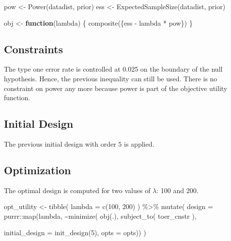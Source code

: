\documentclass[
]{book}
\newenvironment{Shaded}{\begin{snugshade}}{\end{snugshade}}
\newcommand{\AttributeTok}[1]{\textcolor[rgb]{0.77,0.63,0.00}{#1}}
\newcommand{\ControlFlowTok}[1]{\textcolor[rgb]{0.13,0.29,0.53}{\textbf{#1}}}
\newcommand{\DecValTok}[1]{\textcolor[rgb]{0.00,0.00,0.81}{#1}}
\newcommand{\FunctionTok}[1]{\textcolor[rgb]{0.00,0.00,0.00}{#1}}
\newcommand{\NormalTok}[1]{#1}
\newcommand{\OtherTok}[1]{\textcolor[rgb]{0.56,0.35,0.01}{#1}}
\newcommand{\SpecialCharTok}[1]{\textcolor[rgb]{0.00,0.00,0.00}{#1}}
\begin{document}
\begin{Shaded}
\begin{Highlighting}[]
\NormalTok{pow }\OtherTok{\textless{}{-}} \FunctionTok{Power}\NormalTok{(datadist, prior)}
\NormalTok{ess }\OtherTok{\textless{}{-}} \FunctionTok{ExpectedSampleSize}\NormalTok{(datadist, prior)}

\NormalTok{obj }\OtherTok{\textless{}{-}} \ControlFlowTok{function}\NormalTok{(lambda) \{}
  \FunctionTok{composite}\NormalTok{(\{ess }\SpecialCharTok{{-}}\NormalTok{ lambda }\SpecialCharTok{*}\NormalTok{ pow\})}
\NormalTok{\}}
\end{Highlighting}
\end{Shaded}

\hypertarget{constraints-11}{%
\subsection{Constraints}\label{constraints-11}}

The type one error rate is controlled at 0.025 on the boundary of the
null hypothesis. Hence, the previous inequality can still be used.
There is no constraint on power any more because power is part of the
objective utility function.

\hypertarget{initial-design-9}{%
\subsection{Initial Design}\label{initial-design-9}}

The previous initial design with order \(5\) is applied.

\hypertarget{optimization-10}{%
\subsection{Optimization}\label{optimization-10}}

The optimal design is computed for two values of \(\lambda\): 100 and 200.

\begin{Shaded}
\begin{Highlighting}[]
\NormalTok{opt\_utility }\OtherTok{\textless{}{-}} \FunctionTok{tibble}\NormalTok{(}
  \AttributeTok{lambda =} \FunctionTok{c}\NormalTok{(}\DecValTok{100}\NormalTok{, }\DecValTok{200}\NormalTok{)}
\NormalTok{) }\SpecialCharTok{\%\textgreater{}\%}
  \FunctionTok{mutate}\NormalTok{(}
    \AttributeTok{design =}\NormalTok{ purrr}\SpecialCharTok{::}\FunctionTok{map}\NormalTok{(lambda, }\SpecialCharTok{\textasciitilde{}}\FunctionTok{minimize}\NormalTok{(}
          \FunctionTok{obj}\NormalTok{(.),}
          \FunctionTok{subject\_to}\NormalTok{(}
\NormalTok{              toer\_cnstr}
\NormalTok{          ),}
          
          \AttributeTok{initial\_design =} \FunctionTok{init\_design}\NormalTok{(}\DecValTok{5}\NormalTok{), }
          \AttributeTok{opts           =}\NormalTok{ opts)) }
\NormalTok{)}
\end{Highlighting}
\end{Shaded}
\end{document}
